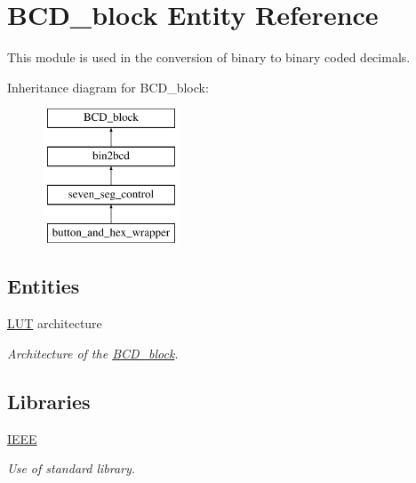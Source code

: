 \hypertarget{classBCD__block}{\section{B\-C\-D\-\_\-block Entity Reference}
\label{classBCD__block}
}


This module is used in the conversion of binary to binary coded decimals.  


Inheritance diagram for B\-C\-D\-\_\-block\-:\begin{figure}[H]
\begin{center}
\leavevmode
\includegraphics[height=4.000000cm]{classBCD__block}
\end{center}
\end{figure}
\subsection*{Entities}
\begin{DoxyCompactItemize}
\item 
\hyperlink{classBCD__block_1_1LUT}{L\-U\-T} architecture
\begin{DoxyCompactList}\small\item\em Architecture of the \hyperlink{classBCD__block}{B\-C\-D\-\_\-block}. \end{DoxyCompactList}\end{DoxyCompactItemize}
\subsection*{Libraries}
 \begin{DoxyCompactItemize}
\item 
\hypertarget{classBCD__block_ae4f03c286607f3181e16b9aa12d0c6d4}{\hyperlink{classBCD__block_ae4f03c286607f3181e16b9aa12d0c6d4}{I\-E\-E\-E} }\label{classBCD__block_ae4f03c286607f3181e16b9aa12d0c6d4}

\begin{DoxyCompactList}\small\item\em Use of standard library. \end{DoxyCompactList}\end{DoxyCompactItemize}
